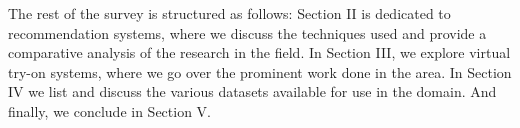 	The rest of the survey is structured as follows: Section II is dedicated to recommendation systems, where we discuss the techniques used and provide a comparative analysis of the research in the field. In Section III, we explore virtual try-on systems, where we go over the prominent work done in the area. In Section IV we list and discuss the various datasets available for use in the domain. And finally, we conclude in Section V.